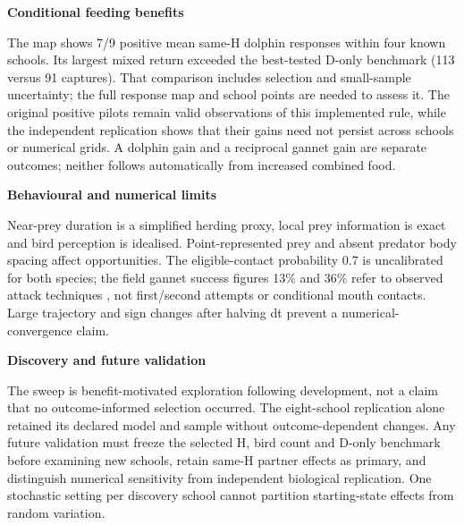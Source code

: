 \documentclass[10pt,a4paper]{article}
\begin{document}
\begin{minipage}[t]{238.10999999999999pt}\vspace{0pt}
\textbf{Conditional feeding benefits}\par The map shows 7/9 positive mean same-H dolphin responses within four known schools. Its largest mixed return exceeded the best-tested D-only benchmark (113 versus 91 captures). That comparison includes selection and small-sample uncertainty; the full response map and school points are needed to assess it. The original positive pilots remain valid observations of this implemented rule, while the independent replication shows that their gains need not persist across schools or numerical grids. A dolphin gain and a reciprocal gannet gain are separate outcomes; neither follows automatically from increased combined food.\par\smallskip
\textbf{Behavioural and numerical limits}\par Near-prey duration is a simplified herding proxy, local prey information is exact and bird perception is idealised. Point-represented prey and absent predator body spacing affect opportunities. The eligible-contact probability 0.7 is uncalibrated for both species; the field gannet success figures 13\% and 36\% refer to observed attack techniques \citep{thiebault2016}, not first/second attempts or conditional mouth contacts. Large trajectory and sign changes after halving dt prevent a numerical-convergence claim.\par\smallskip
\textbf{Discovery and future validation}\par The sweep is benefit-motivated exploration following development, not a claim that no outcome-informed selection occurred. The eight-school replication alone retained its declared model and sample without outcome-dependent changes. Any future validation must freeze the selected H, bird count and D-only benchmark before examining new schools, retain same-H partner effects as primary, and distinguish numerical sensitivity from independent biological replication. One stochastic setting per discovery school cannot partition starting-state effects from random variation.\par\smallskip
\end{minipage}
\hfill
\end{document}
